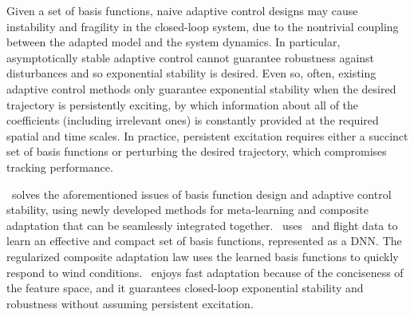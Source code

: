 Given a set of basis functions, naive adaptive control designs may cause instability and fragility in the closed-loop system, due to the nontrivial coupling between the adapted model and the system dynamics. 
In particular, asymptotically stable adaptive control cannot guarantee robustness against disturbances and so exponential stability is desired.  Even so, often, existing adaptive control methods only guarantee exponential stability when the desired trajectory is persistently exciting, by which information about all of the coefficients (including irrelevant ones) is constantly provided at the required spatial and time scales. In practice, persistent excitation requires either a succinct set of basis functions or perturbing the desired trajectory, which compromises tracking performance.


\nf~solves the aforementioned issues of basis function design and adaptive control stability, using newly developed methods for meta-learning and composite adaptation that can be seamlessly integrated together. \nf~uses \DAML~and flight data to learn an effective and compact set of basis functions, represented as a DNN. The regularized composite adaptation law uses the learned basis functions to quickly respond to wind conditions. \nf~enjoys fast adaptation because of the conciseness of the feature space, and it guarantees closed-loop exponential stability and robustness without assuming persistent excitation.

